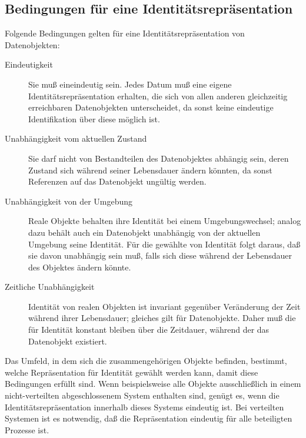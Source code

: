 \subsection{Bedingungen f\"{u}r eine
Identit\"{a}tsrepr\"{a}sentation}\label{sec:cobjid}%
%
Folgende Bedingungen gelten f\"{u}r eine Identit\"{a}tsrepr\"{a}sentation
von Datenobjekten:
%
\begin{description}
%
\item[Eindeutigkeit] Sie mu\ss{} eineindeutig sein. Jedes
Datum mu\ss{} eine eigene Iden\-ti\-t\"{a}ts\-re\-pr\"{a}\-sen\-ta\-tion
erhalten, die sich von allen anderen gleichzeitig erreichbaren
Datenobjekten unterscheidet, da sonst keine eindeutige Identifikation
\"{u}ber diese \representationform{} m\"{o}glich ist.
%
\item[Unabh\"{a}ngigkeit vom aktuellen Zustand] Sie
darf nicht von Bestandteilen des Datenobjektes abh\"{a}ngig sein, deren
Zustand sich w\"{a}hrend seiner Lebensdauer \"{a}ndern k\"{o}nnten, da sonst
Referenzen auf das Datenobjekt ung\"{u}ltig werden.
%
\item[Unabh\"{a}ngigkeit von der Umgebung] Reale Objekte behalten ihre
Identit\"{a}t bei einem Umgebungswechsel; analog dazu beh\"{a}lt auch ein
Datenobjekt unabh\"{a}ngig von der aktuellen Umgebung seine Identit\"{a}t.
F\"{u}r die gew\"{a}hlte \representationform{} von Identit\"{a}t folgt daraus,
da\ss{} sie davon unabh\"{a}ngig sein mu\ss{}, falls sich diese w\"{a}hrend der
Lebensdauer des Objektes \"{a}ndern k\"{o}nnte.
%
\item[Zeitliche Unabh\"{a}ngigkeit] Identit\"{a}t von realen Objekten ist
invariant gegen\"{u}ber Ver\"{a}nderung der Zeit w\"{a}h\-rend ihrer
Lebensdauer; gleiches gilt f\"{u}r Datenobjekte. Daher mu\ss{} die
\representationform{} f\"{u}r Identit\"{a}t konstant bleiben \"{u}ber die
Zeitdauer, w\"{a}hrend der das Datenobjekt existiert.
%
\end{description}
%
Das Umfeld, in dem sich die zusammengeh\"{o}rigen Objekte befinden,
bestimmt, welche Re\-pr\"{a}\-sen\-ta\-tion f\"{u}r Identit\"{a}t gew\"{a}hlt
werden kann, damit diese Bedingungen erf\"{u}llt sind.
%
Wenn beispielsweise alle Objekte ausschlie\ss{}lich in einem
nicht-verteilten abgeschlossenem System enthalten sind, gen\"{u}gt es,
wenn die Identit\"{a}tsrepr\"{a}sentation innerhalb dieses Systems eindeutig
ist.  Bei verteilten Systemen ist es notwendig, da\ss{} die
Repr\"{a}sentation eindeutig f\"{u}r alle beteiligten Prozesse ist.
%
